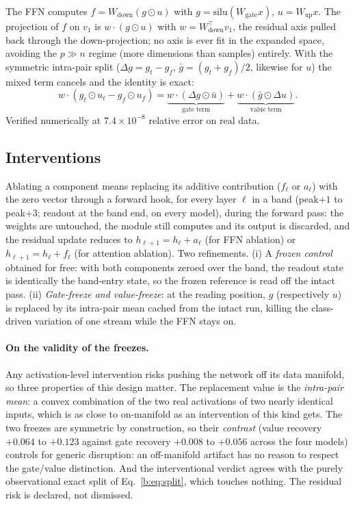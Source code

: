 \documentclass[11pt]{article}
\begin{document}
The FFN computes $f = W_{\mathrm{down}}(g \odot u)$ with
$g = \mathrm{silu}(W_{\mathrm{gate}} x)$, $u = W_{\mathrm{up}} x$. The
projection of $f$ on $v_1$ is $w \cdot (g \odot u)$ with
$w = W_{\mathrm{down}}^{\top} v_1$, the residual axis pulled back through
the down-projection; no axis is ever fit in the expanded space, avoiding the
$p \gg n$ regime (more dimensions than samples) entirely. With the symmetric
intra-pair split ($\Delta g = g_t - g_f$, $\bar g = (g_t + g_f)/2$, likewise
for $u$) the mixed term cancels and the identity is exact:
\begin{equation}
w \cdot (g_t \odot u_t - g_f \odot u_f)
= \underbrace{w \cdot (\Delta g \odot \bar u)}_{\text{gate term}}
+ \underbrace{w \cdot (\bar g \odot \Delta u)}_{\text{value term}}.
\label{b:eq:split}
\end{equation}
Verified numerically at $7.4 \times 10^{-8}$ relative error on real data.

\subsection{Interventions}
\label{b:sec:interventions}

Ablating a component means replacing its additive contribution ($f_{\ell}$
or $a_{\ell}$) with the zero vector through a forward hook, for every layer
$\ell$ in a band (peak$+1$ to peak$+3$; readout at the band end, on every
model), during the forward pass: the weights are untouched, the module still
computes and its output is discarded, and the residual update reduces to
$h_{\ell+1} = h_{\ell} + a_{\ell}$ (for FFN ablation) or
$h_{\ell+1} = h_{\ell} + f_{\ell}$ (for attention ablation). Two
refinements. (i) A
\emph{frozen control} obtained for free: with both components zeroed over
the band, the readout state is identically the band-entry state, so the
frozen reference is read off the intact pass. (ii) \emph{Gate-freeze and
value-freeze}: at the reading position, $g$ (respectively $u$) is replaced
by its intra-pair mean cached from the intact run, killing the class-driven
variation of one stream while the FFN stays on.

\paragraph{On the validity of the freezes.} Any activation-level
intervention risks pushing the network off its data manifold, so three
properties of this design matter. The replacement value is the
\emph{intra-pair mean}: a convex combination of the two real activations
of two nearly identical inputs, which is as close to on-manifold as an
intervention of this kind gets. The two freezes are symmetric by
construction, so their \emph{contrast} (value recovery $+0.064$ to
$+0.123$ against gate recovery $+0.008$ to $+0.056$ across the four
models) controls for generic disruption: an off-manifold artifact has no
reason to respect the gate/value distinction. And the interventional
verdict agrees with the purely observational exact split of
Eq.~\ref{b:eq:split}, which touches nothing. The residual risk is
declared, not dismissed.
\end{document}
